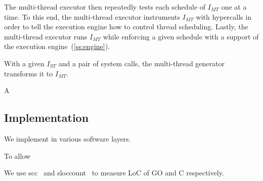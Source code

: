 The multi-thread executor then repeatedly tests each schedule of
$I_{MT}$ one at a time.
%
To this end, the multi-thread executor instruments $I_{MT}$ with
hypercalls in order to tell the execution engine how to control thread
scheduling.
%
Lastly, the multi-thread executor runs $I_{MT}$ while enforcing a
given schedule with a support of the execution
engine~(\autoref{ss:engine}).




%





With a given $I_{ST}$ and a pair of system calls, the multi-thread
generator transforms it to $I_{MT}$.




%
A 





\subsection{Implementation}
\label{ss:impl}

We implement \sys in various software layers.
%

%
To allow 


We use scc~\cite{scc} and sloccount~\cite{sloccount} to measure LoC of
GO and C respectively.


